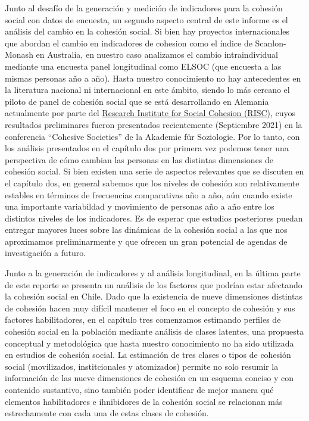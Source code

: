 \documentclass[
  12pt,
]{book}
\begin{document}
Junto al desafío de la generación y medición de indicadores para la cohesión social con datos de encuesta, un segundo aspecto central de este informe es el análisis del cambio en la cohesión social. Si bien hay proyectos internacionales que abordan el cambio en indicadores de cohesion como el índice de Scanlon-Monash en Australia, en nuestro caso analizamos el cambio intraindividual mediante una encuesta panel longitudinal como ELSOC (que encuesta a las mismas personas año a año). Hasta nuestro conocimiento no hay antecedentes en la literatura nacional ni internacional en este ámbito, siendo lo más cercano el piloto de panel de cohesión social que se está desarrollando en Alemania actualmente por parte del \href{https://www.fgz-risc.de/}{Research Institute for Social Cohesion (RISC)}, cuyos resultados preliminares fueron presentados recientemente (Septiembre 2021) en la conferencia ``Cohesive Societies'' de la Akademie für Soziologie. Por lo tanto, con los análisis presentados en el capítulo dos por primera vez podemos tener una perspectiva de cómo cambian las personas en las distintas dimensiones de cohesión social. Si bien existen una serie de aspectos relevantes que se discuten en el capítulo dos, en general sabemos que los niveles de cohesión son relativamente estables en términos de frecuencias comparativas año a año, aún cuando existe una importante variabildad y movimiento de personas año a año entre los distintos niveles de los indicadores. Es de esperar que estudios posteriores puedan entregar mayores luces sobre las dinámicas de la cohesión social a las que nos aproximamos preliminarmente y que ofrecen un gran potencial de agendas de investigación a futuro.

Junto a la generación de indicadores y al análisis longitudinal, en la última parte de este reporte se presenta un análisis de los factores que podrían estar afectando la cohesión social en Chile. Dado que la existencia de nueve dimensiones distintas de cohesión hacen muy difícil mantener el foco en el concepto de cohesión y sus factores habilitadores, en el capítulo tres comenzamos estimando perfiles de cohesión social en la población mediante análisis de clases latentes, una propuesta conceptual y metodológica que hasta nuestro conocimiento no ha sido utilizada en estudios de cohesión social. La estimación de tres clases o tipos de cohesión social (movilizados, institcionales y atomizados) permite no solo resumir la información de las nueve dimensiones de cohesión en un esquema conciso y con contenido sustantivo, sino también poder identificar de mejor manera qué elementos habilitadores e ihnibidores de la cohesión social se relacionan más estrechamente con cada una de estas clases de cohesión.
\end{document}
